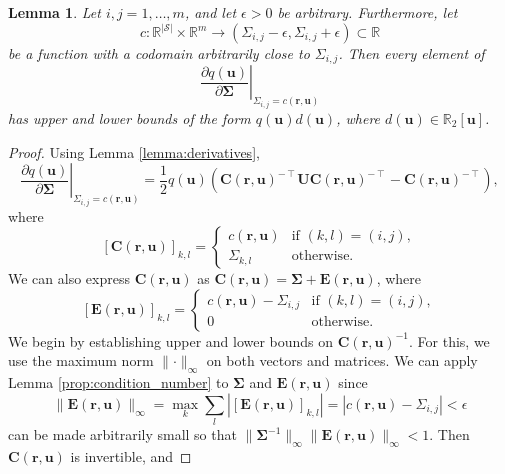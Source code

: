 \documentclass{mpaper}
\newtheorem{lemma}[theorem]{Lemma}
\begin{document}
\begin{lemma} \label{lemma:bound3}
  Let $i, j = 1, \dots, m$, and let $\epsilon > 0$ be arbitrary. Furthermore,
  let
  \[
    c : \mathbb{R}^{|\mathcal{S}|} \times \mathbb{R}^m \to (\Sigma_{i,j} - \epsilon,
    \Sigma_{i,j} + \epsilon) \subset \mathbb{R}
  \]
  be a function with a codomain arbitrarily close to $\Sigma_{i,j}$. Then every
  element of
  \[
    \left. \frac{\partial q(\mathbf{u})}{\partial \bm\Sigma} \right|_{\Sigma_{i,j} =
    c(\mathbf{r}, \mathbf{u})}
  \]
  has upper and lower bounds of the form $q(\mathbf{u})d(\mathbf{u})$, where
  $d(\mathbf{u}) \in \mathbb{R}_2[\mathbf{u}]$.
\end{lemma}
\begin{proof}
  Using Lemma \ref{lemma:derivatives},
  \[
    \left. \frac{\partial q(\mathbf{u})}{\partial \bm\Sigma} \right|_{\Sigma_{i,j} =
    c(\mathbf{r}, \mathbf{u})} =
    \frac{1}{2}q(\mathbf{u})(\mathbf{C}(\mathbf{r},
    \mathbf{u})^{-\intercal}\mathbf{UC}(\mathbf{r}, \mathbf{u})^{-\intercal} -
    \mathbf{C}(\mathbf{r}, \mathbf{u})^{-\intercal}),
  \]
  where
  \[
    [\mathbf{C}(\mathbf{r}, \mathbf{u})]_{k,l} =
    \begin{cases}
      c(\mathbf{r}, \mathbf{u}) & \text{if } (k, l) = (i, j), \\
      \Sigma_{k,l} & \text{otherwise.}
    \end{cases}
  \]
  We can also express $\mathbf{C}(\mathbf{r},\mathbf{u})$ as
  $\mathbf{C}(\mathbf{r}, \mathbf{u}) = \bm\Sigma + \mathbf{E}(\mathbf{r},
  \mathbf{u})$, where
  \[
    [\mathbf{E}(\mathbf{r}, \mathbf{u})]_{k,l} =
    \begin{cases}
      c(\mathbf{r}, \mathbf{u}) - \Sigma_{i,j} & \text{if } (k, l) = (i, j), \\
      0 & \text{otherwise.}
    \end{cases}
  \]
  We begin by establishing upper and lower bounds on $\mathbf{C}(\mathbf{r},
  \mathbf{u})^{-1}$. For this, we use the maximum norm $\lVert \cdot
  \rVert_\infty$ on both vectors and matrices. We can apply Lemma
  \ref{prop:condition_number} to $\bm\Sigma$ and $\mathbf{E}(\mathbf{r},
  \mathbf{u})$ since
  \[
    \lVert \mathbf{E}(\mathbf{r}, \mathbf{u}) \rVert_\infty = \max_k \sum_l
    |[\mathbf{E}(\mathbf{r}, \mathbf{u})]_{k,l}| = |c(\mathbf{r}, \mathbf{u}) -
    \Sigma_{i,j}| < \epsilon
  \]
  can be made arbitrarily small so that $\lVert \bm\Sigma^{-1} \rVert_\infty
  \lVert \mathbf{E}(\mathbf{r}, \mathbf{u}) \rVert_\infty < 1$. Then
  $\mathbf{C}(\mathbf{r}, \mathbf{u})$ is invertible, and

\end{proof}
\end{document}
